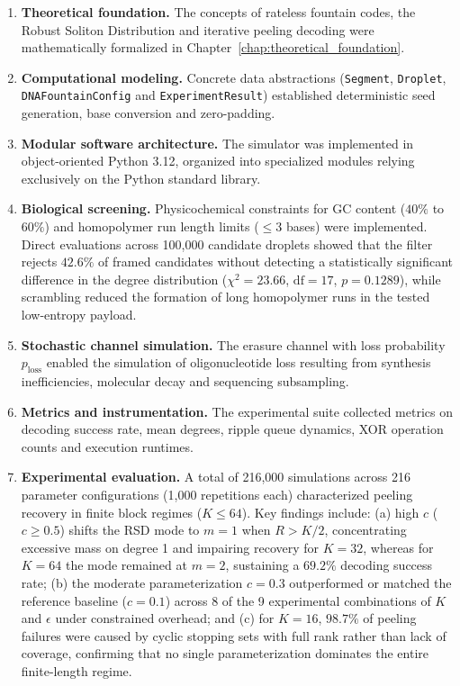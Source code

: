 \begin{enumerate}
    \item \textbf{Theoretical foundation.} The concepts of rateless fountain codes, the Robust Soliton Distribution and iterative peeling decoding were mathematically formalized in Chapter~\ref{chap:theoretical_foundation}.
    
    \item \textbf{Computational modeling.} Concrete data abstractions (\texttt{Segment}, \texttt{Droplet}, \texttt{DNAFountainConfig} and \texttt{ExperimentResult}) established deterministic seed generation, base conversion and zero-padding.
    
    \item \textbf{Modular software architecture.} The simulator was implemented in object-oriented Python 3.12, organized into specialized modules relying exclusively on the Python standard library.
    
    \item \textbf{Biological screening.} Physicochemical constraints for GC content ($40\%$ to $60\%$) and homopolymer run length limits ($\le 3$ bases) were implemented. Direct evaluations across 100,000 candidate droplets showed that the filter rejects $42.6\%$ of framed candidates without detecting a statistically significant difference in the degree distribution ($\chi^2 = 23.66$, $\text{df} = 17$, $p = 0.1289$), while scrambling reduced the formation of long homopolymer runs in the tested low-entropy payload.
    
    \item \textbf{Stochastic channel simulation.} The erasure channel with loss probability $p_{\text{loss}}$ enabled the simulation of oligonucleotide loss resulting from synthesis inefficiencies, molecular decay and sequencing subsampling.
    
    \item \textbf{Metrics and instrumentation.} The experimental suite collected metrics on decoding success rate, mean degrees, ripple queue dynamics, XOR operation counts and execution runtimes.
    
    \item \textbf{Experimental evaluation.} A total of 216,000 simulations across 216 parameter configurations (1,000 repetitions each) characterized peeling recovery in finite block regimes ($K \le 64$). Key findings include: (a) high $c$ ($c \ge 0.5$) shifts the RSD mode to $m=1$ when $R > K/2$, concentrating excessive mass on degree 1 and impairing recovery for $K = 32$, whereas for $K = 64$ the mode remained at $m=2$, sustaining a $69.2\%$ decoding success rate; (b) the moderate parameterization $c = 0.3$ outperformed or matched the reference baseline ($c = 0.1$) across 8 of the 9 experimental combinations of $K$ and $\epsilon$ under constrained overhead; and (c) for $K = 16$, $98.7\%$ of peeling failures were caused by cyclic stopping sets with full rank rather than lack of coverage, confirming that no single parameterization dominates the entire finite-length regime.
    

\end{enumerate}
